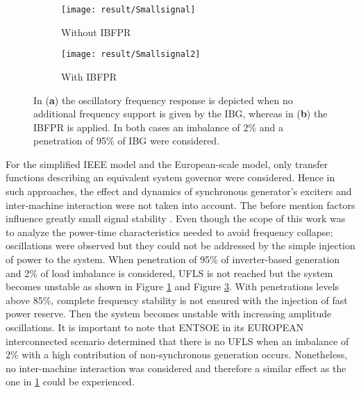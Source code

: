 \begin{figure}[h]
	\centering
	\begin{subfigure}[h]{0.49\textwidth}
		\centering
		\texttt{[image: result/Smallsignal]}
		\caption{Without IBFPR}
		\label{fig:res_osc_noIBFPR}
	\end{subfigure}
	\hfill
	\begin{subfigure}[h]{0.49\textwidth}
		\centering
		\texttt{[image: result/Smallsignal2]}
		\caption{With IBFPR}
		\label{fig:res_osc_IBFPR}
	\end{subfigure}
	
	
	\caption{In (\textbf{a}) the oscillatory frequency response is depicted when no additional frequency support is given by the IBG, whereas in  (\textbf{b}) the IBFPR is applied. In both cases an imbalance of 2\% and a penetration of 95\% of IBG were considered.}
\end{figure}


For the simplified IEEE model and the European-scale model, only transfer functions describing an equivalent system governor were considered. Hence in such approaches, the effect and dynamics of synchronous generator’s exciters and inter-machine interaction were not taken into account. The before mention factors influence greatly small signal stability \cite{kundur1994power, Anderson.2002}. Even though the scope of this work was to analyze the power-time characteristics needed to avoid frequency collapse; oscillations were observed but they could not be addressed by the simple injection of power to the system. When penetration of 95\% of inverter-based generation and 2\% of load imbalance is considered, UFLS is not reached but the system becomes unstable as shown in Figure \ref{fig:res_osc_noIBFPR} and Figure \ref{fig:res_osc_IBFPR}. With penetrations levels above 85\%, complete frequency stability is not ensured with the injection of fast power reserve. Then the system becomes unstable with increasing amplitude oscillations. It is important to note that ENTSOE in its EUROPEAN interconnected scenario determined that there is no UFLS when an imbalance of 2\% with a high contribution of non-synchronous generation occurs.  Nonetheless, no inter-machine interaction was considered and therefore a similar effect as the one in \ref{fig:res_osc_noIBFPR} could be experienced.